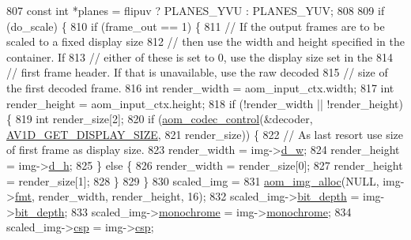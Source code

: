 \begin{DoxyCodeInclude}
{{{{{{{{{{{{{{{{{{{{{{{{{{{{{{{{{{{{{{{{{{{{{807         \textcolor{keyword}{const} \textcolor{keywordtype}{int} *planes = flipuv ? PLANES\_YVU : PLANES\_YUV;
808 
809         \textcolor{keywordflow}{if} (do\_scale) \{
810           \textcolor{keywordflow}{if} (frame\_out == 1) \{
811             \textcolor{comment}{// If the output frames are to be scaled to a fixed display size}
812             \textcolor{comment}{// then use the width and height specified in the container. If}
813             \textcolor{comment}{// either of these is set to 0, use the display size set in the}
814             \textcolor{comment}{// first frame header. If that is unavailable, use the raw decoded}
815             \textcolor{comment}{// size of the first decoded frame.}
816             \textcolor{keywordtype}{int} render\_width = aom\_input\_ctx.width;
817             \textcolor{keywordtype}{int} render\_height = aom\_input\_ctx.height;
818             \textcolor{keywordflow}{if} (!render\_width || !render\_height) \{
819               \textcolor{keywordtype}{int} render\_size[2];
820               \textcolor{keywordflow}{if} (\hyperlink{group__codec_ga6da974f4eeaba1fa74106b28d0fe6ac5}{aom\_codec\_control}(&decoder, 
      \hyperlink{group__aom__decoder_gga3865fd4b3192489baa9a5c3632ebe97ba592a5d1390204d743ddfe7bfe8ef177c}{AV1D\_GET\_DISPLAY\_SIZE},
821                                     render\_size)) \{
822                 \textcolor{comment}{// As last resort use size of first frame as display size.}
823                 render\_width = img->\hyperlink{structaom__image_a89f80b1f58d608b9d2080635f4359034}{d\_w};
824                 render\_height = img->\hyperlink{structaom__image_ab986419a1f0fff93a2dc505f47194988}{d\_h};
825               \} \textcolor{keywordflow}{else} \{
826                 render\_width = render\_size[0];
827                 render\_height = render\_size[1];
828               \}
829             \}
830             scaled\_img =
831                 \hyperlink{aom__image_8h_a570db29fbd122951235a08fe9375f6bb}{aom\_img\_alloc}(NULL, img->\hyperlink{structaom__image_a6c64b1ab918d80d52eb8f5d6d957e825}{fmt}, render\_width, render\_height, 16);
832             scaled\_img->\hyperlink{structaom__image_a46ed9ffd741938d306a0db5a24bdcf8e}{bit\_depth} = img->\hyperlink{structaom__image_a46ed9ffd741938d306a0db5a24bdcf8e}{bit\_depth};
833             scaled\_img->\hyperlink{structaom__image_ab7886616025ff8bd0bb96d967fca9ad8}{monochrome} = img->\hyperlink{structaom__image_ab7886616025ff8bd0bb96d967fca9ad8}{monochrome};
834             scaled\_img->\hyperlink{structaom__image_a4f235c521bc95a061e9e0b2a3d5d457e}{csp} = img->\hyperlink{structaom__image_a4f235c521bc95a061e9e0b2a3d5d457e}{csp};
}}}}}}}}}}}}}}}}}}}}}}}}}}}}}}}}}}}}}}}}}}}}}
\end{DoxyCodeInclude}
